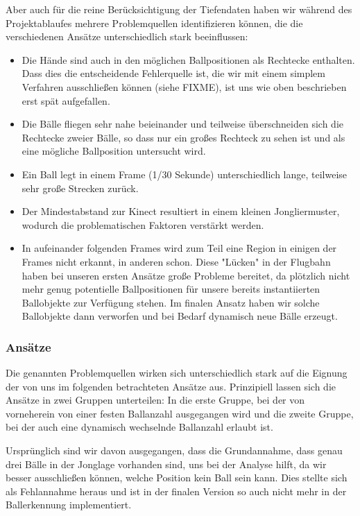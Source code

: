 \documentclass[12pt,a4paper,ngerman]{scrartcl}
\begin{document}
Aber auch für die reine Berücksichtigung der Tiefendaten haben wir während des
Projektablaufes mehrere Problemquellen identifizieren können, die die verschiedenen
Ansätze unterschiedlich stark beeinflussen:

\begin{itemize}
 \item Die Hände sind auch in den möglichen Ballpositionen als Rechtecke enthalten. Dass dies die entscheidende Fehlerquelle ist, die wir mit einem simplem Verfahren ausschließen können (siehe FIXME), ist uns wie oben beschrieben erst spät aufgefallen.
 \item Die Bälle fliegen sehr nahe beieinander und teilweise überschneiden sich die Rechtecke zweier Bälle, so dass nur ein großes Rechteck zu sehen ist und als eine mögliche Ballposition untersucht wird.
 \item Ein Ball legt in einem Frame (1/30 Sekunde) unterschiedlich lange, teilweise sehr große Strecken zurück.
 \item Der Mindestabstand zur Kinect resultiert in einem kleinen Jongliermuster, wodurch die problematischen Faktoren verstärkt werden.
 \item In aufeinander folgenden Frames wird zum Teil eine Region in einigen der Frames nicht erkannt, in anderen schon. Diese "Lücken" in der Flugbahn haben bei unseren ersten Ansätze große Probleme bereitet, da plötzlich nicht mehr genug potentielle Ballpositionen für unsere bereits instantiierten Ballobjekte zur Verfügung stehen. Im finalen Ansatz haben wir solche Ballobjekte dann verworfen und
 bei Bedarf dynamisch neue Bälle erzeugt.
\end{itemize}

\subsubsection{Ansätze}

Die genannten Problemquellen wirken sich unterschiedlich stark auf die Eignung der von
uns im folgenden betrachteten Ansätze aus. Prinzipiell lassen sich die Ansätze
in zwei Gruppen unterteilen: In die erste Gruppe, bei der von vorneherein von einer
festen Ballanzahl ausgegangen wird und die zweite Gruppe, bei der auch eine dynamisch wechselnde Ballanzahl erlaubt ist.

Ursprünglich sind wir davon ausgegangen, dass die Grundannahme, dass genau drei
Bälle in der Jonglage vorhanden sind, uns bei der Analyse hilft, da wir besser
ausschließen können, welche Position kein Ball sein kann. Dies stellte sich als
Fehlannahme heraus und ist in der finalen Version so auch nicht mehr in der
Ballerkennung implementiert.
\end{document}
